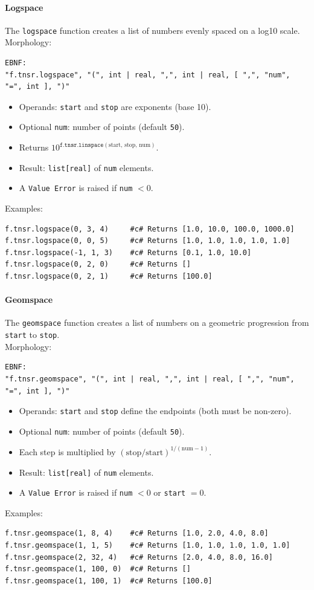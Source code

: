 \paragraph{Logspace}
The \texttt{logspace} function creates a list of numbers evenly spaced on a log10 scale.\\
Morphology:
\begin{verbatim}
EBNF:
"f.tnsr.logspace", "(", int | real, ",", int | real, [ ",", "num", "=", int ], ")"
\end{verbatim}
\begin{itemize}
\item Operands: \texttt{start} and \texttt{stop} are exponents (base 10).
\item Optional \texttt{num}: number of points (default \texttt{50}).
\item Returns $10^{\texttt{f.tnsr.linspace}(\text{start},\,\text{stop},\,\text{num})}$.
\item Result: \texttt{list[real]} of \texttt{num} elements.
\item A \texttt{Value Error} is raised if \texttt{num} $< 0$.
\end{itemize}
Examples:
\begin{verbatim}
f.tnsr.logspace(0, 3, 4)     #c# Returns [1.0, 10.0, 100.0, 1000.0]
f.tnsr.logspace(0, 0, 5)     #c# Returns [1.0, 1.0, 1.0, 1.0, 1.0]
f.tnsr.logspace(-1, 1, 3)    #c# Returns [0.1, 1.0, 10.0]
f.tnsr.logspace(0, 2, 0)     #c# Returns []
f.tnsr.logspace(0, 2, 1)     #c# Returns [100.0]
\end{verbatim}

\paragraph{Geomspace}
The \texttt{geomspace} function creates a list of numbers on a geometric progression from \texttt{start} to \texttt{stop}.\\
Morphology:
\begin{verbatim}
EBNF:
"f.tnsr.geomspace", "(", int | real, ",", int | real, [ ",", "num", "=", int ], ")"
\end{verbatim}
\begin{itemize}
\item Operands: \texttt{start} and \texttt{stop} define the endpoints (both must be non-zero).
\item Optional \texttt{num}: number of points (default \texttt{50}).
\item Each step is multiplied by $(\text{stop} / \text{start})^{1/(\text{num}-1)}$.
\item Result: \texttt{list[real]} of \texttt{num} elements.
\item A \texttt{Value Error} is raised if \texttt{num} $< 0$ or \texttt{start} $= 0$.
\end{itemize}
Examples:
\begin{verbatim}
f.tnsr.geomspace(1, 8, 4)    #c# Returns [1.0, 2.0, 4.0, 8.0]
f.tnsr.geomspace(1, 1, 5)    #c# Returns [1.0, 1.0, 1.0, 1.0, 1.0]
f.tnsr.geomspace(2, 32, 4)   #c# Returns [2.0, 4.0, 8.0, 16.0]
f.tnsr.geomspace(1, 100, 0)  #c# Returns []
f.tnsr.geomspace(1, 100, 1)  #c# Returns [100.0]
\end{verbatim}

